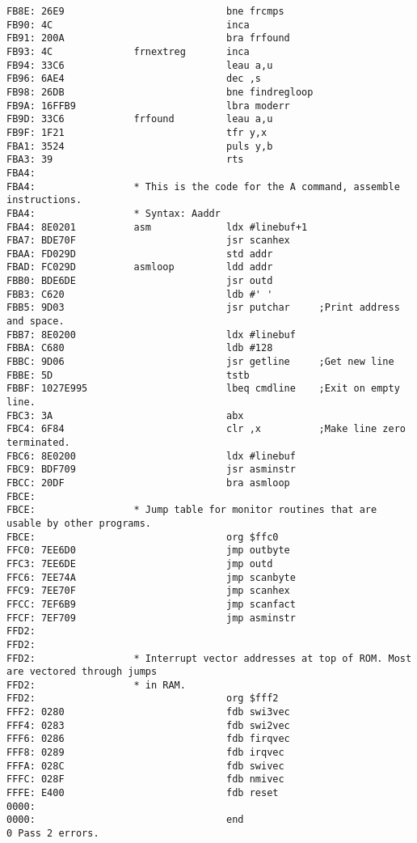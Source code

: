 {\begin{verbatim}
FB8E: 26E9                            bne frcmps
FB90: 4C                              inca
FB91: 200A                            bra frfound
FB93: 4C              frnextreg       inca
FB94: 33C6                            leau a,u
FB96: 6AE4                            dec ,s
FB98: 26DB                            bne findregloop
FB9A: 16FFB9                          lbra moderr
FB9D: 33C6            frfound         leau a,u
FB9F: 1F21                            tfr y,x
FBA1: 3524                            puls y,b
FBA3: 39                              rts
FBA4:                 
FBA4:                 * This is the code for the A command, assemble instructions.
FBA4:                 * Syntax: Aaddr
FBA4: 8E0201          asm             ldx #linebuf+1
FBA7: BDE70F                          jsr scanhex
FBAA: FD029D                          std addr
FBAD: FC029D          asmloop         ldd addr
FBB0: BDE6DE                          jsr outd
FBB3: C620                            ldb #' '
FBB5: 9D03                            jsr putchar     ;Print address and space.
FBB7: 8E0200                          ldx #linebuf
FBBA: C680                            ldb #128
FBBC: 9D06                            jsr getline     ;Get new line
FBBE: 5D                              tstb    
FBBF: 1027E995                        lbeq cmdline    ;Exit on empty line.
FBC3: 3A                              abx 
FBC4: 6F84                            clr ,x          ;Make line zero terminated.
FBC6: 8E0200                          ldx #linebuf
FBC9: BDF709                          jsr asminstr
FBCC: 20DF                            bra asmloop
FBCE:                                         
FBCE:                 * Jump table for monitor routines that are usable by other programs.
FBCE:                                 org $ffc0
FFC0: 7EE6D0                          jmp outbyte
FFC3: 7EE6DE                          jmp outd
FFC6: 7EE74A                          jmp scanbyte
FFC9: 7EE70F                          jmp scanhex
FFCC: 7EF6B9                          jmp scanfact
FFCF: 7EF709                          jmp asminstr
FFD2:                                 
FFD2:                                                                                 
FFD2:                 * Interrupt vector addresses at top of ROM. Most are vectored through jumps
FFD2:                 * in RAM.
FFD2:                                 org $fff2
FFF2: 0280                            fdb swi3vec
FFF4: 0283                            fdb swi2vec
FFF6: 0286                            fdb firqvec
FFF8: 0289                            fdb irqvec
FFFA: 028C                            fdb swivec
FFFC: 028F                            fdb nmivec
FFFE: E400                            fdb reset
0000:                 
0000:                                 end
0 Pass 2 errors.


\end{verbatim}}
